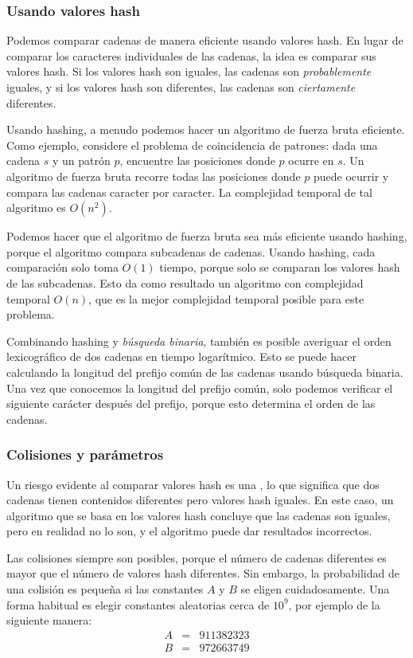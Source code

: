 \subsubsection*{Usando valores hash}
Podemos comparar cadenas de manera eficiente usando valores hash.
En lugar de comparar los caracteres individuales de las cadenas,
la idea es comparar sus valores hash.
Si los valores hash son iguales,
las cadenas son \emph{probablemente} iguales,
y si los valores hash son diferentes,
las cadenas son \emph{ciertamente} diferentes.

Usando hashing, a menudo podemos hacer un algoritmo de fuerza bruta
eficiente.
Como ejemplo, considere el problema de coincidencia de patrones:
dada una cadena $s$ y un patrón $p$,
encuentre las posiciones donde $p$ ocurre en $s$.
Un algoritmo de fuerza bruta recorre todas las posiciones
donde $p$ puede ocurrir y compara las cadenas
caracter por caracter.
La complejidad temporal de tal algoritmo es $O(n^2)$.

Podemos hacer que el algoritmo de fuerza bruta sea más eficiente
usando hashing, porque el algoritmo compara
subcadenas de cadenas.
Usando hashing, cada comparación solo toma $O(1)$ tiempo,
porque solo se comparan los valores hash de las subcadenas.
Esto da como resultado un algoritmo con complejidad temporal $O(n)$,
que es la mejor complejidad temporal posible para este problema.

Combinando hashing y \emph{búsqueda binaria},
también es posible averiguar el orden lexicográfico de
dos cadenas en tiempo logarítmico.
Esto se puede hacer calculando la longitud
del prefijo común de las cadenas usando búsqueda binaria.
Una vez que conocemos la longitud del prefijo común,
solo podemos verificar el siguiente carácter después del prefijo,
porque esto determina el orden de las cadenas.

\subsubsection*{Colisiones y parámetros}


Un riesgo evidente al comparar valores hash es
una , lo que significa que dos cadenas tienen
contenidos diferentes pero valores hash iguales.
En este caso, un algoritmo que se basa en
los valores hash concluye que las cadenas son iguales,
pero en realidad no lo son,
y el algoritmo puede dar resultados incorrectos.

Las colisiones siempre son posibles,
porque el número de cadenas diferentes es mayor
que el número de valores hash diferentes.
Sin embargo, la probabilidad de una colisión es pequeña
si las constantes $A$ y $B$ se eligen cuidadosamente.
Una forma habitual es elegir constantes aleatorias
cerca de $10^9$, por ejemplo de la siguiente manera:
\[
\begin{array}{lcl}
A & = & 911382323 \\
B & = & 972663749 \\
\end{array}
\]

